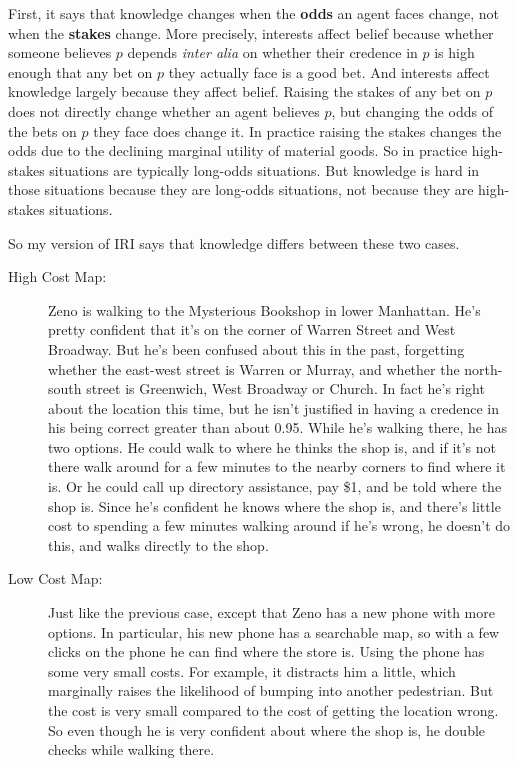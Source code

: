 \documentclass[
  11pt,
  letterpaper,
  DIV=11,
  numbers=noendperiod,
  oneside]{scrartcl}
\begin{document}
First, it says that knowledge changes when the \textbf{odds} an agent
faces change, not when the \textbf{stakes} change. More precisely,
interests affect belief because whether someone believes \(p\) depends
\emph{inter alia} on whether their credence in \(p\) is high enough that
any bet on \(p\) they actually face is a good bet. And interests affect
knowledge largely because they affect belief. Raising the stakes of any
bet on \(p\) does not directly change whether an agent believes \(p\),
but changing the odds of the bets on \(p\) they face does change it. In
practice raising the stakes changes the odds due to the declining
marginal utility of material goods. So in practice high-stakes
situations are typically long-odds situations. But knowledge is hard in
those situations because they are long-odds situations, not because they
are high-stakes situations.

So my version of IRI says that knowledge differs between these two
cases.

\begin{description}
\item[High Cost Map:]
Zeno is walking to the Mysterious Bookshop in lower Manhattan. He's
pretty confident that it's on the corner of Warren Street and West
Broadway. But he's been confused about this in the past, forgetting
whether the east-west street is Warren or Murray, and whether the
north-south street is Greenwich, West Broadway or Church. In fact he's
right about the location this time, but he isn't justified in having a
credence in his being correct greater than about 0.95. While he's
walking there, he has two options. He could walk to where he thinks the
shop is, and if it's not there walk around for a few minutes to the
nearby corners to find where it is. Or he could call up directory
assistance, pay \$1, and be told where the shop is. Since he's confident
he knows where the shop is, and there's little cost to spending a few
minutes walking around if he's wrong, he doesn't do this, and walks
directly to the shop.
\item[Low Cost Map:]
Just like the previous case, except that Zeno has a new phone with more
options. In particular, his new phone has a searchable map, so with a
few clicks on the phone he can find where the store is. Using the phone
has some very small costs. For example, it distracts him a little, which
marginally raises the likelihood of bumping into another pedestrian. But
the cost is very small compared to the cost of getting the location
wrong. So even though he is very confident about where the shop is, he
double checks while walking there.
\end{description}
\end{document}
